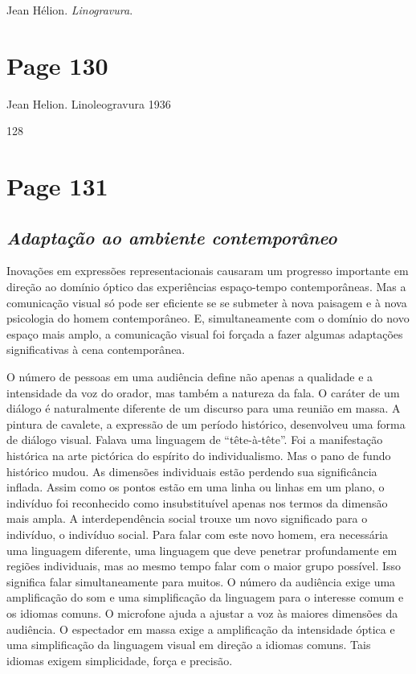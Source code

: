 \documentclass[a4paper]{article}
\begin{document}
\noindent Jean Hélion. \textit{Linogravura}.
\vfill
{}

\newpage
\section*{Page 130}

Jean Helion. Linoleogravura 1936

\vspace*{\fill}
128

\newpage
\section*{Page 131}

\subsection*{\textit{Adaptação ao ambiente contemporâneo}}

Inovações em expressões representacionais causaram um progresso importante em direção ao domínio óptico das experiências espaço-tempo contemporâneas. Mas a comunicação visual só pode ser eficiente se se submeter à nova paisagem e à nova psicologia do homem contemporâneo. E, simultaneamente com o domínio do novo espaço mais amplo, a comunicação visual foi forçada a fazer algumas adaptações significativas à cena contemporânea.

O número de pessoas em uma audiência define não apenas a qualidade e a intensidade da voz do orador, mas também a natureza da fala. O caráter de um diálogo é naturalmente diferente de um discurso para uma reunião em massa. A pintura de cavalete, a expressão de um período histórico, desenvolveu uma forma de diálogo visual. Falava uma linguagem de ``tête-à-tête''. Foi a manifestação histórica na arte pictórica do espírito do individualismo. Mas o pano de fundo histórico mudou. As dimensões individuais estão perdendo sua significância inflada. Assim como os pontos estão em uma linha ou linhas em um plano, o indivíduo foi reconhecido como insubstituível apenas nos termos da dimensão mais ampla. A interdependência social trouxe um novo significado para o indivíduo, o indivíduo social. Para falar com este novo homem, era necessária uma linguagem diferente, uma linguagem que deve penetrar profundamente em regiões individuais, mas ao mesmo tempo falar com o maior grupo possível. Isso significa falar simultaneamente para muitos. O número da audiência exige uma amplificação do som e uma simplificação da linguagem para o interesse comum e os idiomas comuns. O microfone ajuda a ajustar a voz às maiores dimensões da audiência. O espectador em massa exige a amplificação da intensidade óptica e uma simplificação da linguagem visual em direção a idiomas comuns. Tais idiomas exigem simplicidade, força e precisão.
\end{document}
